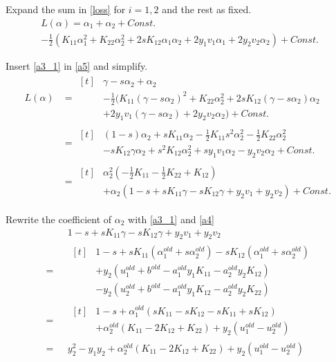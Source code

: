 \documentclass[a4paper]{article}
\begin{document}
Expand the sum in \eqref{loss} for $i = 1,2$ and the rest as fixed. 
\begin{multline}
\label{a5}
L(\alpha) = \alpha_1 + \alpha_2 + Const. \\
- \frac{1}{2}( K_{11}\alpha_1^2 + K_{22} \alpha_2^2 + 2sK_{12}\alpha_1\alpha_2 + 2y_1v_1\alpha_1 + 2y_2v_2\alpha_2) + Const.
\end{multline}

Insert \eqref{a3_1} in \eqref{a5} and simplify.
\begin{align}
L(\alpha) &= \begin{aligned}[t]
& \gamma - s \alpha_2  + \alpha_2 \\
& - \frac{1}{2} ( K_{11}(\gamma - s \alpha_2)^2 + K_{22} \alpha_2 ^2 + 2sK_{12}(\gamma - s \alpha_2)\alpha_2 \\
&  + 2y_1v_1(\gamma - s\alpha_2) + 2y_2v_2\alpha_2 ) + Const.
\end{aligned} \\
&= \begin{aligned}[t]
& (1-s)\alpha_2 + sK_{11}\alpha_2 - \frac{1}{2}K_{11}s^2\alpha_2^2 -\frac{1}{2}K_{22}\alpha_2^2 \\
& -sK_{12}\gamma\alpha_2 +s^2K_{12}\alpha_2^2 + sy_1v_1\alpha_2 - y_2v_2\alpha_2 + Const.
\end{aligned} \\
&= \begin{aligned}[t]
& \alpha_2^2 (-\frac{1}{2}K_{11} - \frac{1}{2}K_{22} + K_{12})  \\
& + \alpha_2(1 - s + sK_{11}\gamma -sK_{12}\gamma + y_2v_1 + y_2v_2) + Const.
\end{aligned}
\end{align}

Rewrite the coefficient of $\alpha_2$ with \eqref{a3_1} and \eqref{a4}
\begin{align}
&1 - s + sK_{11}\gamma -sK_{12}\gamma + y_2v_1 + y_2v_2 \\
=\text{ }& \begin{aligned}[t]
& 1 - s + sK_{11}(\alpha_1^{old} + s\alpha_2^{old}) -sK_{12}(\alpha_1^{old} + s\alpha_2^{old}) \\
& + y_2(u_1^{old} + b^{old} - a_1^{old}y_1K_{11} - a_2^{old}y_2K_{12}) \\
& - y_2(u_2^{old} + b^{old} - a_1^{old}y_1K_{12} - a_2^{old}y_2K_{22})
\end{aligned} \\
=\text{ }& \begin{aligned}[t]
& 1-s + \alpha_1^{old}(sK_{11} - sK_{12} - sK_{11} + sK_{12}) \\
& + \alpha_2^{old}(K_{11} - 2K_{12} + K_{22}) + y_2(u_1^{old} - u_2^{old})
\end{aligned} \\
\label{coff}
=\text{ }& y_2^2 - y_1y_2 + \alpha_2^{old}(K_{11} - 2K_{12} + K_{22}) + y_2(u_1^{old} - u_2^{old})
\end{align}
\end{document}
